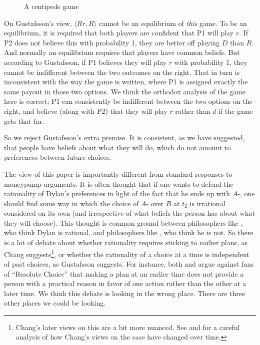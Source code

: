 \documentclass[
  11pt,
  letterpaper]{article}
\begin{document}
\begin{figure}

\centering{



}

\caption{\label{fig-centipede}A centipede game}

\end{figure}%

On Gustafsson's view, $\langle Rr, R \rangle$ cannot be an equilibrium of \emph{this} game. To be an equilibrium, it is required that both players are confident that P1 will play $r$. If P2 does not believe this with probability 1, they are better off playing $D$ than $R$. And normally an equilibrium requires that players have common beliefs. But according to Gustafsson, if P1 believes they will play $r$ with probability 1, they cannot be indifferent between the two outcomes on the right. That in turn is inconsistent with the way the game is written, where P1 is assigned exactly the same payout in those two options. We think the orthodox analysis of the game here is correct; P1 can consistently be indifferent between the two options on the right, and believe (along with P2) that they will play $r$ rather than $d$ if the game gets that far.

So we reject Gustafsson's extra premise. It is consistent, as we have suggested, that people have beliefs about what they will do, which do not amount to preferences between future choices.

The view of this paper is importantly different from standard responses to moneypump arguments. It is often thought that if one wants to defend the rationality of Dylan's preferences in light of the fact that he ends up with $A$-, one should find some way in which the choice of $A$- over $B$ at $t_2$ is irrational considered on its own (and irrespective of what beliefs the person has about what they will choose). This thought is common ground between philosophers like \citet{Chang2005}, who think Dylan is rational, and philosophers like \citet{Gustafsson2022}, who think he is not. So there is a lot of debate about whether rationality requires sticking to earlier plans, as Chang suggests\footnote{Chang's later views on this are a bit more nuanced. See \citet{Chang2017} and \citet[sect. 4]{Doody2019} for a careful analysis of how Chang's views on the case have changed over time.}, or whether the rationality of a choice at a time is independent of past choices, as Gustafsson suggests. For instance, both \citet[p. 8-9]{Elga2010} and \citet[p. 66-74]{Gustafsson2022} argue against fans of ``Resolute Choice'' that making a plan at an earlier time does not provide a person with a practical reason in favor of one action rather than the other at a later time. We think this debate is looking in the wrong place. There are three other places we could be looking.
\end{document}
